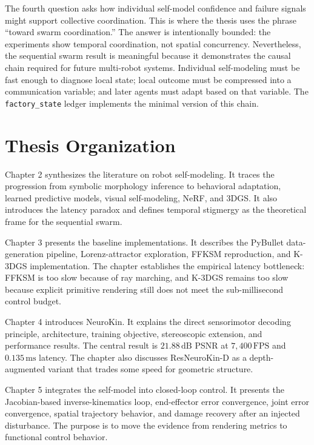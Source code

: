 \documentclass[12pt,a4paper,oneside]{report}
\begin{document}
The fourth question asks how individual self-model confidence and failure signals might support collective coordination. This is where the thesis uses the phrase ``toward swarm coordination.'' The answer is intentionally bounded: the experiments show temporal coordination, not spatial concurrency. Nevertheless, the sequential swarm result is meaningful because it demonstrates the causal chain required for future multi-robot systems. Individual self-modeling must be fast enough to diagnose local state; local outcome must be compressed into a communication variable; and later agents must adapt based on that variable. The \texttt{factory\_state} ledger implements the minimal version of this chain.

\section{Thesis Organization}

Chapter 2 synthesizes the literature on robot self-modeling. It traces the progression from symbolic morphology inference to behavioral adaptation, learned predictive models, visual self-modeling, NeRF, and 3DGS. It also introduces the latency paradox and defines temporal stigmergy as the theoretical frame for the sequential swarm.

Chapter 3 presents the baseline implementations. It describes the PyBullet data-generation pipeline, Lorenz-attractor exploration, FFKSM reproduction, and K-3DGS implementation. The chapter establishes the empirical latency bottleneck: FFKSM is too slow because of ray marching, and K-3DGS remains too slow because explicit primitive rendering still does not meet the sub-millisecond control budget.

Chapter 4 introduces NeuroKin. It explains the direct sensorimotor decoding principle, architecture, training objective, stereoscopic extension, and performance results. The central result is $21.88\,\mathrm{dB}$ PSNR at $7{,}400\,\mathrm{FPS}$ and $0.135\,\mathrm{ms}$ latency. The chapter also discusses ResNeuroKin-D as a depth-augmented variant that trades some speed for geometric structure.

Chapter 5 integrates the self-model into closed-loop control. It presents the Jacobian-based inverse-kinematics loop, end-effector error convergence, joint error convergence, spatial trajectory behavior, and damage recovery after an injected disturbance. The purpose is to move the evidence from rendering metrics to functional control behavior.
\end{document}
